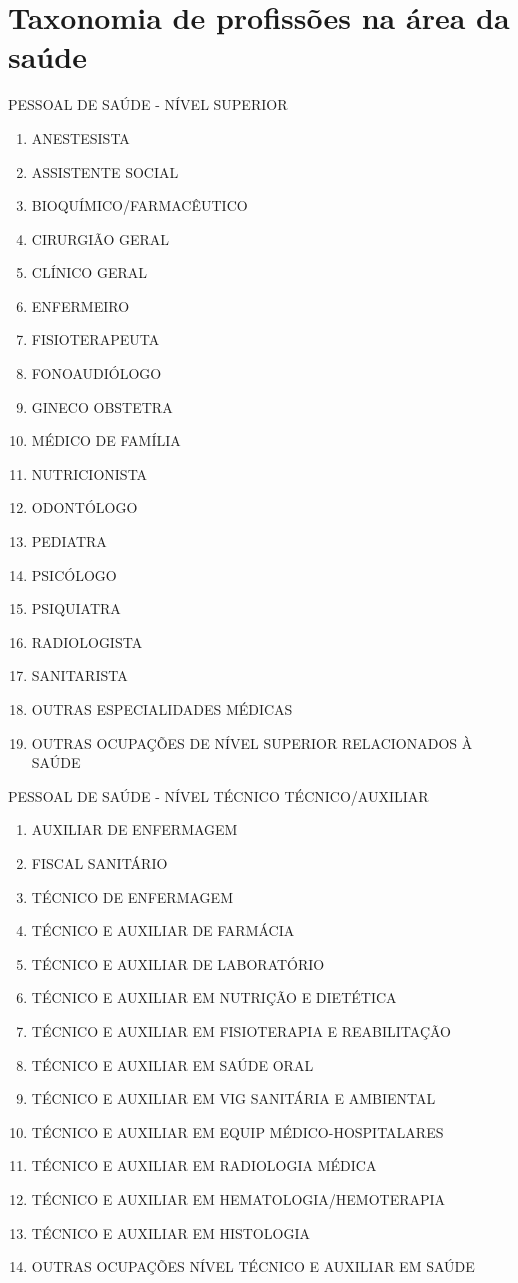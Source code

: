 \documentclass[a4paper,11pt]{article}
\begin{document}
\section{Taxonomia de profissões na área da saúde}
\label{app:anexoI}
PESSOAL DE SAÚDE - NÍVEL SUPERIOR
\begin{enumerate}
    \item ANESTESISTA
    \item ASSISTENTE SOCIAL
    \item BIOQUÍMICO/FARMACÊUTICO
    \item CIRURGIÃO GERAL
    \item CLÍNICO GERAL
    \item ENFERMEIRO
    \item FISIOTERAPEUTA
    \item FONOAUDIÓLOGO
    \item GINECO OBSTETRA
    \item MÉDICO DE FAMÍLIA
    \item NUTRICIONISTA
    \item ODONTÓLOGO
    \item PEDIATRA
    \item PSICÓLOGO
    \item PSIQUIATRA
    \item RADIOLOGISTA
    \item SANITARISTA
    \item OUTRAS ESPECIALIDADES MÉDICAS
    \item OUTRAS OCUPAÇÕES DE NÍVEL SUPERIOR RELACIONADOS À SAÚDE
\end{enumerate}
PESSOAL DE SAÚDE - NÍVEL TÉCNICO TÉCNICO/AUXILIAR
\begin{enumerate}
    \item AUXILIAR DE ENFERMAGEM
    \item FISCAL SANITÁRIO
    \item TÉCNICO DE ENFERMAGEM
    \item TÉCNICO E AUXILIAR DE FARMÁCIA
    \item TÉCNICO E AUXILIAR DE LABORATÓRIO
    \item TÉCNICO E AUXILIAR EM NUTRIÇÃO E DIETÉTICA
    \item TÉCNICO E AUXILIAR EM FISIOTERAPIA E REABILITAÇÃO
    \item TÉCNICO E AUXILIAR EM SAÚDE ORAL
    \item TÉCNICO E AUXILIAR EM VIG SANITÁRIA E AMBIENTAL
    \item TÉCNICO E AUXILIAR EM EQUIP MÉDICO-HOSPITALARES
    \item TÉCNICO E AUXILIAR EM RADIOLOGIA MÉDICA
    \item TÉCNICO E AUXILIAR EM HEMATOLOGIA/HEMOTERAPIA
    \item TÉCNICO E AUXILIAR EM HISTOLOGIA
    \item OUTRAS OCUPAÇÕES NÍVEL TÉCNICO E AUXILIAR EM SAÚDE
\end{enumerate}
\end{document}
